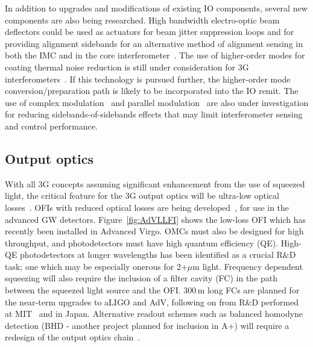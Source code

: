 In addition to upgrades and modifications of existing IO components, several new components are also being researched. High bandwidth electro-optic beam deflectors could be used as actuators for beam jitter suppression loops and for providing alignment sidebands for an alternative method of alignment sensing in both the IMC and in the core interferometer~\cite{RFJASC}. The use of higher-order modes for coating thermal noise reduction is still under consideration for 3G interferometers~\cite{LGmodes}. If this technology is pursued further, the higher-order mode conversion/preparation path is likely to be incorporated into the IO remit. 
The use of complex modulation~\cite{complexmod} and parallel modulation~\cite{kagraMZI} are also under investigation for reducing sidebands-of-sidebands effects that may limit interferometer sensing and control performance.

\subsection{Output optics}
With all 3G concepts assuming significant enhancement from the use of squeezed light, the critical feature for the 3G output optics will be ultra-low optical losses~\cite{squeeze_lossbudget}. OFIs with reduced optical losses are being developed~\cite{EGOLLFI,UFLLFI}, for use in the advanced GW detectors. Figure~\ref{fig:AdVLLFI} shows the low-loss OFI which has recently been installed in Advanced Virgo. OMCs must also be designed for high throughput, and photodetectors must have high quantum efficiency (QE). High-QE photodetectors at longer wavelengths has been identified as a crucial R\&D task; one which may be especially onerous for 2+$\mu$m light. Frequency dependent squeezing will also require the inclusion of a filter cavity (FC) in the path between the squeezed light source and the OFI. 300\,m long FCs are planned for the near-term upgrades to aLIGO and AdV, following on from R\&D performed at MIT~\cite{MITFC} and in Japan\cite{TAMA_FDS2016}. Alternative readout schemes such as balanced homodyne detection (BHD - another project planned for inclusion in A+) will require a redesign of the output optics chain~\cite{BHD}.

